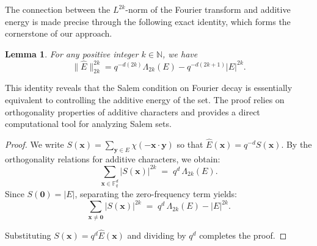 \documentclass[11pt]{article}
\newtheorem{definition}[theorem]{Definition}
\newtheorem{lemma}[theorem]{Lemma}
\begin{document}

The connection between the $L^{2k}$-norm of the Fourier transform and additive energy is made precise through the following exact identity, which forms the cornerstone of our approach.
\begin{lemma}
For any positive integer $k \in \mathbb{N}$, we have 
\begin{equation}
\|\widehat{E}\|_{2k}^{2k} = q^{-d(2k)} \Lambda_{2k}(E) - q^{-d(2k+1)} |E|^{2k}.
\end{equation}
\end{lemma}

This identity reveals that the Salem condition on Fourier decay is essentially equivalent to controlling the additive energy of the set. The proof relies on orthogonality properties of additive characters and provides a direct computational tool for analyzing Salem sets.

\begin{proof}
We write $S(\mathbf{x})=\sum\limits_{\mathbf{y}\in E}\chi(-\mathbf{x}\cdot \mathbf{y})$ so that $\widehat{E}(\mathbf{x})=q^{-d}S(\mathbf{x})$.  By the orthogonality relations for additive characters, we obtain:
\begin{equation*}
		\sum_{\mathbf{x} \in\mathbb{F}_q^d}|S(\mathbf{x})|^{2k}
		\;=\;
		q^d\,\Lambda_{2k}(E).
	\end{equation*}
Since $S(\mathbf{0})=|E|$, separating the zero-frequency term yields:
\begin{equation*}
		\sum_{\mathbf{x} \neq \mathbf{0}}|S(\mathbf{x})|^{2k}
		\;=\;
		q^d\,\Lambda_{2k}(E)-|E|^{2k}.
	\end{equation*}

Substituting $S(\mathbf{x})=q^d\widehat{E}(\mathbf{x})$ and dividing by $q^d$ completes the proof.
\end{proof}
\end{document}
